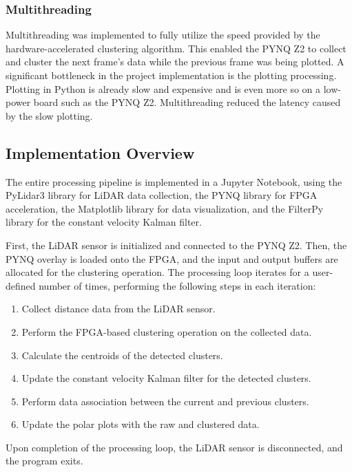 \documentclass[journal]{IEEEtran} %
\begin{document}
\subsubsection{Multithreading}
Multithreading was implemented to fully utilize the speed provided by the hardware-accelerated clustering algorithm. This enabled the PYNQ Z2 to collect and cluster the next frame's data while the previous frame was being plotted. A significant bottleneck in the project implementation is the plotting processing. Plotting in Python is already slow and expensive and is even more so on a low-power board such as the PYNQ Z2. Multithreading reduced the latency caused by the slow plotting.


\subsection{Implementation Overview}

The entire processing pipeline is implemented in a Jupyter Notebook, using the PyLidar3 library for LiDAR data collection, the PYNQ library for FPGA acceleration, the Matplotlib library for data visualization, and the FilterPy library for the constant velocity Kalman filter.

First, the LiDAR sensor is initialized and connected to the PYNQ Z2. Then, the PYNQ overlay is loaded onto the FPGA, and the input and output buffers are allocated for the clustering operation. The processing loop iterates for a user-defined number of times, performing the following steps in each iteration:

\begin{enumerate}
\item Collect distance data from the LiDAR sensor.
\item Perform the FPGA-based clustering operation on the collected data.
\item Calculate the centroids of the detected clusters.
\item Update the constant velocity Kalman filter for the detected clusters.
\item Perform data association between the current and previous clusters.
\item Update the polar plots with the raw and clustered data.
\end{enumerate}

Upon completion of the processing loop, the LiDAR sensor is disconnected, and the program exits.\\
\end{document}
